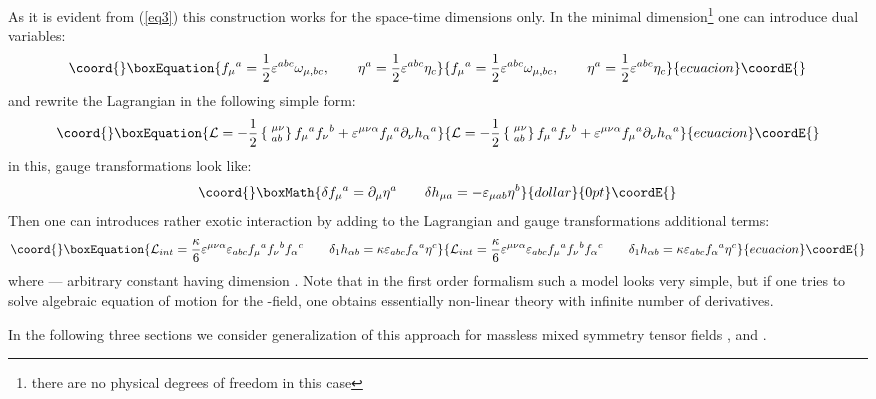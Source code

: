 \documentclass[a4paper,12pt]{article}
\begin{document}
As it is evident from (\ref{eq3}) this construction works for the
space-time dimensions \coordHE{} only. In the minimal
dimension\footnote{there are no physical degrees of freedom in this
case} \coordHE{} one can introduce dual variables:
\begin{equation}\coord{}\boxEquation{
f_\mu{}^a = \frac{1}{2} \varepsilon^{abc} \omega_{\mu,bc}, \qquad
\eta^a = \frac{1}{2} \varepsilon^{abc} \eta_c
}{
f_\mu{}^a = \frac{1}{2} \varepsilon^{abc} \omega_{\mu,bc}, \qquad
\eta^a = \frac{1}{2} \varepsilon^{abc} \eta_c
}{ecuacion}\coordE{}\end{equation}
and rewrite the Lagrangian in the following simple form:
\begin{equation}\coord{}\boxEquation{
{\cal L} = - \frac{1}{2} \left\{ \phantom{|}^{\mu\nu}_{ab} \right\}
f_\mu{}^a f_\nu{}^b + \varepsilon^{\mu\nu\alpha} f_\mu{}^a
\partial_\nu h_\alpha{}^a
}{
{\cal L} = - \frac{1}{2} \left\{ \phantom{|}^{\mu\nu}_{ab} \right\}
f_\mu{}^a f_\nu{}^b + \varepsilon^{\mu\nu\alpha} f_\mu{}^a
\partial_\nu h_\alpha{}^a
}{ecuacion}\coordE{}\end{equation}
in this, gauge transformations look like:
$$\coord{}\boxMath{
\delta f_\mu{}^a = \partial_\mu \eta^a \qquad \delta h_{\mu a} = -
\varepsilon_{\mu a b} \eta^b
}{dollar}{0pt}\coordE{}$$
Then one can introduces rather exotic interaction \cite{BG00} by
adding to the Lagrangian and gauge transformations additional terms:
\begin{equation}\coord{}\boxEquation{
{\cal L}_{int} = \frac{\kappa}{6} \varepsilon^{\mu\nu\alpha}
\varepsilon_{abc} f_\mu{}^a f_\nu{}^b f_\alpha{}^c \qquad \delta_1
h_{\alpha b} = \kappa \varepsilon_{abc} f_\alpha{}^a \eta^c
}{
{\cal L}_{int} = \frac{\kappa}{6} \varepsilon^{\mu\nu\alpha}
\varepsilon_{abc} f_\mu{}^a f_\nu{}^b f_\alpha{}^c \qquad \delta_1
h_{\alpha b} = \kappa \varepsilon_{abc} f_\alpha{}^a \eta^c
}{ecuacion}\coordE{}\end{equation}
where \myHighlight{$\kappa$}\coordHE{} --- arbitrary constant having dimension \coordHE{}.
Note that in the first order formalism such a model looks very simple,
but if one tries to solve algebraic equation of motion for the
\coordHE{}-field, one obtains essentially non-linear theory with infinite
number of derivatives.

In the following three sections we consider generalization of this
approach for massless mixed symmetry tensor fields
\myHighlight{$\Phi_{[\mu\nu],\alpha}$}\coordHE{}, \coordHE{} and
\coordHE{}.
\end{document}
